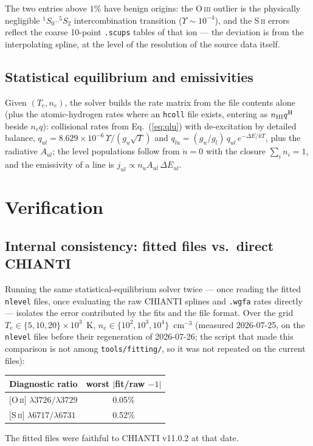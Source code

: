 \documentclass[english,a4paper]{my_memo}
\newcommand{\code}[1]{\texttt{#1}}
\begin{document}
The two entries above $1\%$ have benign origins: the O\,\textsc{iii}
outlier is the physically negligible $^1\!S_0$--$^5\!S_2$
intercombination transition ($\Upsilon \sim 10^{-4}$), and the
S\,\textsc{ii} errors reflect the coarse 10-point \code{.scups} tables of
that ion --- the deviation is from the interpolating spline, at the level
of the resolution of the source data itself.

\subsection{Statistical equilibrium and emissivities}
Given $(T_e, n_e)$, the solver builds the rate matrix from the file
contents alone (plus the atomic-hydrogen rates where an \code{hcoll}
file exists, entering as $n_{\rm HI} q^{\rm H}$ beside $n_e q$):
collisional rates from Eq.~(\ref{eq:qlu}) with
de-excitation by detailed balance,
$q_{ul} = 8.629\times10^{-6}\,\Upsilon/(g_u\sqrt{T})$ and
$q_{lu} = (g_u/g_l)\,q_{ul}\,e^{-\Delta E/kT}$, plus the radiative
$A_{ul}$; the level populations follow from $\dot{n}=0$ with the closure
$\sum_i n_i = 1$, and the emissivity of a line is
$j_{ul} \propto n_u A_{ul}\,\Delta E_{ul}$.

\section{Verification}
\subsection{Internal consistency: fitted files vs.\ direct CHIANTI}
Running the same statistical-equilibrium solver twice --- once reading the
fitted \code{nlevel} files, once evaluating the raw CHIANTI splines and
\code{.wgfa} rates directly --- isolates the error contributed by the fits
and the file format.  Over the grid $T_e \in \{5,10,20\}\times10^3$~K,
$n_e \in \{10^2,10^3,10^4\}$~cm$^{-3}$ (measured 2026-07-25, on the
\code{nlevel} files before their regeneration of 2026-07-26; the script
that made this comparison is not among \code{tools/fitting/}, so it was
not repeated on the current files):
\begin{center}
\begin{tabular}{lc}
\hline
Diagnostic ratio & worst $|$fit/raw $- 1|$ \\
\hline
$[$O\,\textsc{ii}$]$ $\lambda3726/\lambda3729$ & 0.05\% \\
$[$S\,\textsc{ii}$]$ $\lambda6717/\lambda6731$ & 0.52\% \\
\hline
\end{tabular}
\end{center}
The fitted files were faithful to CHIANTI v11.0.2 at that date.
\end{document}
